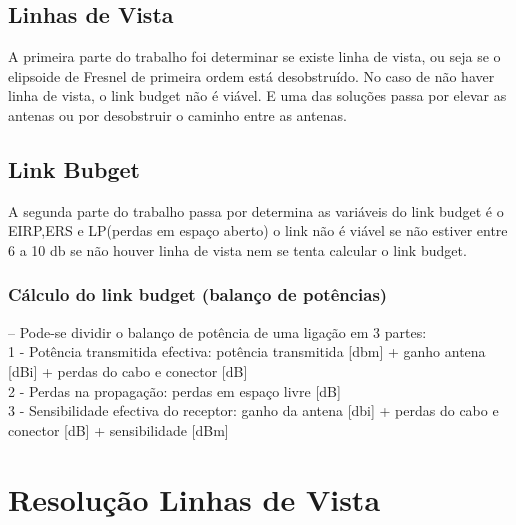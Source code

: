 \documentclass[a4paper,titlepage]{article}
\begin{document}
		\subsection{Linhas de Vista}
		A primeira parte do trabalho foi determinar se existe linha de vista, ou seja se o elipsoide de Fresnel de primeira ordem está desobstruído. No caso de não haver linha de vista, o link budget não é viável. E uma das soluções passa por elevar as antenas ou por desobstruir o caminho entre as antenas.\\
			
		
		
		\subsection{Link Bubget}
		
		A segunda parte do trabalho passa por determina as variáveis do link budget é o EIRP,ERS e LP(perdas em espaço aberto) o link não é viável se não estiver entre 6 a 10 db se não houver linha de vista nem se tenta calcular o link budget.\\
			\subsubsection{Cálculo do link budget (balanço de potências)}
			– Pode-se dividir o balanço de potência de uma ligação em 3
		partes:\\
				1 - Potência transmitida efectiva: potência transmitida [dbm] +
		ganho antena [dBi] + perdas do cabo e conector [dB]\\
				2 - Perdas na propagação: perdas em espaço livre [dB]\\
				3 - Sensibilidade efectiva do receptor: ganho da antena [dbi] +
		perdas do cabo e conector [dB] + sensibilidade [dBm]\\
		\section{Resolução Linhas de Vista}
		
\end{document}
